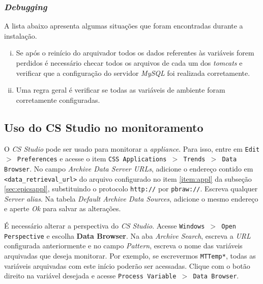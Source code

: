 \subsubsection{\textit{Debugging}}

A lista abaixo apresenta algumas situações que foram encontradas durante a
instalação.

\begin {enumerate}[i.] 
  \item Se após o reinício do arquivador todos os dados referentes às variáveis
  forem perdidos é necessário checar todos os arquivos 
  de cada um dos \textit{tomcats} e verificar que a configuração do servidor
  \textit{MySQL} foi realizada corretamente.

  \item Uma regra geral é verificar se todas as variáveis de ambiente foram
  corretamente configuradas.
\end{enumerate}

\subsection{Uso do CS Studio no monitoramento} \label{appliance-csstudio}

O \textit{CS Studio} pode ser usado para monitorar a \textit{appliance}. Para
isso, entre em \texttt{Edit \(>\) Preferences} e acesse o item \texttt{CSS
Applications \(>\) Trends \(>\) Data Browser}. No campo \textit{Archive Data
Server URLs}, adicione o endereço contido em \texttt{<data\_retrieval\_url>} do
arquivo configurado no item \ref{item:appl} da subseção \ref{sec:epicsappl},
substituindo o protocolo \texttt{http://} por \texttt{pbraw://}. Escreva
qualquer \textit{Server alias}. Na tabela \textit{Default Archive Data Sources},
adicione o mesmo endereço e aperte \textit{Ok} para salvar as alterações.

\vspace{12pt}

É necessário alterar a perspectiva do \textit{CS Studio}. Acesse
\texttt{Windows \(>\) Open Perspective} e escolha \textbf{Data Browser}. Na aba
\textit{Archive Search}, escreva a \textit{URL} configurada anteriormente e no
campo \textit{Pattern}, escreva o nome das variáveis arquivadas que deseja
monitorar. Por exemplo, se escrevermos \texttt{MTTemp*}, todas as variáveis
arquivadas com este início poderão ser acessadas. Clique com o botão direito na
variável desejada e acesse \texttt{Process Variable \(>\) Data Browser}.

